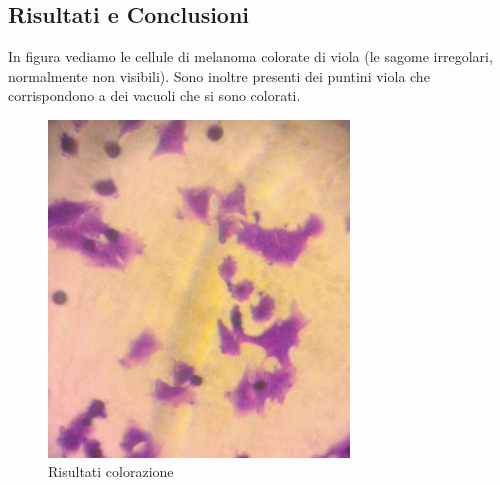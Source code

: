 \subsection{Risultati e Conclusioni}

In figura vediamo le cellule di melanoma colorate di viola (le sagome irregolari, normalmente non visibili).
Sono inoltre presenti dei puntini viola che corrispondono a dei vacuoli che si sono colorati.

\begin{figure}[htbp]
	\centering
	\includegraphics[width=80mm]{./immagini/melanoma.png}
	\caption{Risultati colorazione}
	\label{melanoma}
\end{figure}
